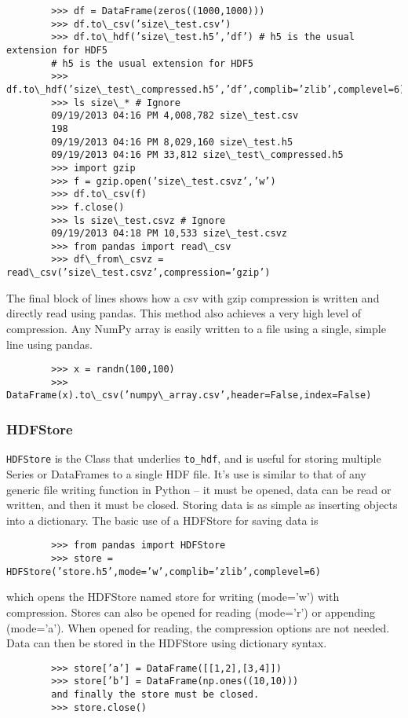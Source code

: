 \documentclass[KSmain.tex]{subfiles}
\begin{document}
	\begin{framed}
		\begin{verbatim}
		>>> df = DataFrame(zeros((1000,1000)))
		>>> df.to\_csv(’size\_test.csv’)
		>>> df.to\_hdf(’size\_test.h5’,’df’) # h5 is the usual extension for HDF5
		# h5 is the usual extension for HDF5
		>>> df.to\_hdf(’size\_test\_compressed.h5’,’df’,complib=’zlib’,complevel=6)
		>>> ls size\_* # Ignore
		09/19/2013 04:16 PM 4,008,782 size\_test.csv
		198
		09/19/2013 04:16 PM 8,029,160 size\_test.h5
		09/19/2013 04:16 PM 33,812 size\_test\_compressed.h5
		>>> import gzip
		>>> f = gzip.open(’size\_test.csvz’,’w’)
		>>> df.to\_csv(f)
		>>> f.close()
		>>> ls size\_test.csvz # Ignore
		09/19/2013 04:18 PM 10,533 size\_test.csvz
		>>> from pandas import read\_csv
		>>> df\_from\_csvz = read\_csv(’size\_test.csvz’,compression=’gzip’)
		\end{verbatim}
		\end{framed}
		The final block of lines shows how a csv with gzip compression is written and directly read using pandas.
		This method also achieves a very high level of compression.
		Any NumPy array is easily written to a file using a single, simple line using pandas.
		\begin{framed}
			\begin{verbatim}
		>>> x = randn(100,100)
		>>> DataFrame(x).to\_csv(’numpy\_array.csv’,header=False,index=False)
		\end{verbatim}
		\end{framed}
	\subsubsection{ HDFStore}
		\texttt{HDFStore} is the Class that underlies \texttt{to\_hdf}, and is useful for storing multiple Series or DataFrames to a
		single HDF file. It’s use is similar to that of any generic file writing function in Python – it must be opened,
		data can be read or written, and then it must be closed. Storing data is as simple as inserting objects into
		a dictionary.
		The basic use of a HDFStore for saving data is
			\begin{framed}
				\begin{verbatim}
		>>> from pandas import HDFStore
		>>> store = HDFStore(’store.h5’,mode=’w’,complib=’zlib’,complevel=6)
	\end{verbatim}
\end{framed}
which opens the HDFStore named store for writing (mode=’w’) with compression. Stores can also be
		opened for reading (mode=’r’) or appending (mode=’a’). When opened for reading, the compression options
		are not needed. Data can then be stored in the HDFStore using dictionary syntax.
		\begin{framed}
			\begin{verbatim}
		>>> store[’a’] = DataFrame([[1,2],[3,4]])
		>>> store[’b’] = DataFrame(np.ones((10,10)))
		and finally the store must be closed.
		>>> store.close()
		\end{verbatim}
	\end{framed}
\end{document}
